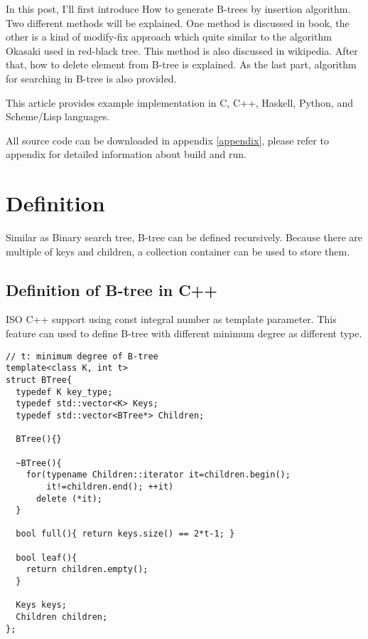 \documentclass{article}
\begin{document}
In this post, I'll first introduce How to generate B-trees by insertion
algorithm. Two different methods will be explained. One method is discussed in \cite{CLRS}
book, the other is a kind of modify-fix approach which quite similar to the
algorithm Okasaki used in red-black tree\cite{okasaki-rbtree}. This method
is also discussed in wikipedia\cite{wiki-b-tree}. After that, how to delete
element from B-tree is explained. As the last part, algorithm for searching 
in B-tree is also provided.

This article provides example implementation in C, C++, Haskell, Python, and 
Scheme/Lisp languages. 

All source code can be downloaded in appendix \ref{appendix}, please 
refer to appendix for detailed information about build and run.

\section{Definition}
\label{btree-definition}

Similar as Binary search tree, B-tree can be defined recursively.
Because there are multiple of keys and children, a collection container
can be used to store them.

\subsection*{Definition of B-tree in C++}
ISO C++ support using const integral number as template parameter.
This feature can used to define B-tree with different minimum degree
as different type.

\lstset{language=C++}
\begin{lstlisting}
// t: minimum degree of B-tree
template<class K, int t>
struct BTree{
  typedef K key_type;
  typedef std::vector<K> Keys;
  typedef std::vector<BTree*> Children;

  BTree(){}

  ~BTree(){
    for(typename Children::iterator it=children.begin();
        it!=children.end(); ++it)
      delete (*it);
  }

  bool full(){ return keys.size() == 2*t-1; }

  bool leaf(){
    return children.empty();
  }

  Keys keys;
  Children children; 
};
\end{lstlisting}
\end{document}
